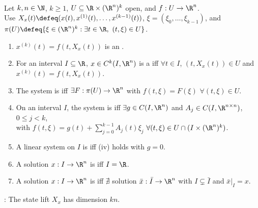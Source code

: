 \begin{definition} \label{def:explicit-ode-systems-and-classes} \\
Let $k,n\in\N$, $k\geq1$, $U\subseteq\R\times(\R^n)^k$ open, and $f:U\to\R^n$.\\
Use $X_x(t)\defeq(x(t),x^{(1)}(t),\ldots,x^{(k-1)}(t))$, $\xi=(\xi_0,\ldots,\xi_{k-1})$, and $\pi(U)\defeq\{\xi\in(\R^n)^k:\exists t\in\R,\ (t,\xi)\in U\}$.
\begin{enumerate}[label=(\roman*)]
\setlength{\itemsep}{0pt}
\item $x^{(k)}(t)=f(t,X_x(t))$ is an .
\item For an interval $I\subseteq\R$, $x\in C^k(I,\R^n)$ is a  iff $\forall t\in I$, $(t,X_x(t))\in U$ and $x^{(k)}(t)=f(t,X_x(t))$.
\item The system is  iff $\exists F:\pi(U)\to\R^n$ with $f(t,\xi)=F(\xi)$ $\forall(t,\xi)\in U$.
\item On an interval $I$, the system is  iff $\exists g\in C(I,\R^n)$ and $A_j\in C(I,\R^{n\times n})$, $0\leq j<k$,\\
with $f(t,\xi)=g(t)+\sum\limits_{j=0}^{k-1}A_j(t)\xi_j$ $\forall(t,\xi)\in U\cap(I\times(\R^n)^k)$.
\item A linear system on $I$ is  iff (iv) holds with $g=0$.
\item A solution $x:I\to\R^n$ is  iff $I=\R$.
\item A solution $x:I\to\R^n$ is  iff $\nexists$ solution $\bar{x}:\bar{I}\to\R^n$ with $I\subsetneq\bar{I}$ and $\bar{x}|_I=x$.
\end{enumerate}
: The state lift $X_x$ has dimension $kn$.
\end{definition}

